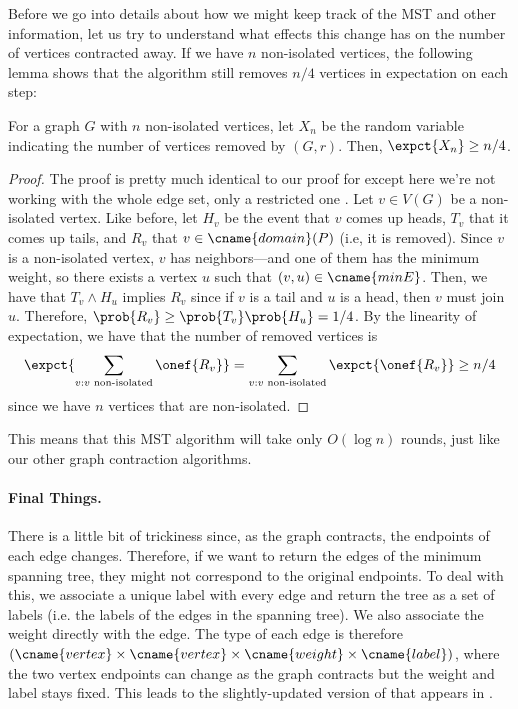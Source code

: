 Before we go into details about how we might keep track of the MST and
other information, let us try to understand what effects this change
has on the number of vertices contracted away.  If we have $n$
non-isolated vertices, the following lemma shows that the algorithm
still removes $n/4$ vertices in expectation on each step:

\begin{lemma}
  For a graph $G$ with $n$ non-isolated vertices, let $X_n$ be the random
  variable indicating the number of vertices removed by
  $(G,r)$.  Then, $\expct{X_n} \geq n/4$.
\end{lemma}
\begin{proof}
  The proof is pretty much identical to our proof for
   except here we're not working with the whole
  edge set, only a restricted one .  Let $v \in V(G)$ be a
  non-isolated vertex.  Like before, let $H_v$ be the event that $v$
  comes up heads, $T_v$ that it comes up tails, and $R_v$ that $v \in
  \cname{domain}(P)$ (i.e, it is removed).  Since $v$ is a
  non-isolated vertex, $v$ has neighbors---and one of them has the
  minimum weight, so there exists a vertex $u$ such that $(v,u) \in
  \cname{minE}$.  Then, we have that $T_v \land H_u$ implies $R_v$
  since if $v$ is a tail and $u$ is a head, then $v$ must join $u$.
  Therefore, $\prob{R_v} \geq \prob{T_v} \prob{H_u} = 1/4$.  By the
  linearity of expectation, we have that the number of removed
  vertices is
  \begin{equation*}
    \expct{\sum_{v: v \text{ non-isolated}} \onef{R_v}} = \sum_{v: v \text{ non-isolated}} \expct{\onef{R_v}} \geq n/4
  \end{equation*}
  since we have $n$ vertices that are non-isolated.
\end{proof}

This means that this MST algorithm will take only $O(\log n)$ rounds,
just like our other graph contraction algorithms.

\paragraph{Final Things.} There is a little bit of trickiness since, as the
graph contracts, the endpoints of each edge changes.  Therefore, if we
want to return the edges of the minimum spanning tree, they might not
correspond to the original endpoints.  To deal with this, we associate
a unique label with every edge and return the tree as a set of labels
(i.e. the labels of the edges in the spanning tree).  We also
associate the weight directly with the edge.  The type of each edge is
therefore $(\cname{vertex} \times \cname{vertex} \times \cname{weight}
\times \cname{label})$, where the two vertex endpoints can change as
the graph contracts but the weight and label stays fixed.  This leads
to the slightly-updated version of  that
appears in .

